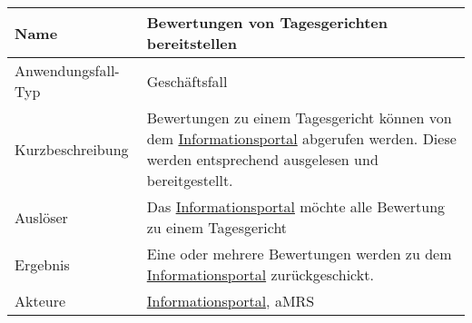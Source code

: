 \begin{table}[H]
    \centering
    \label{bewertungenbereitstellen}
    \begin{tabularx}{\textwidth}{| l | X |}
        \hline
        Name               & Bewertungen von Tagesgerichten bereitstellen                                                                                                                                      \\
        \hline
        Anwendungsfall-Typ & Geschäftsfall                                                                                                                                                                     \\
        \hline
        Kurzbeschreibung   & Bewertungen zu einem Tagesgericht können von dem \hyperref[gls:informationsportal]{Informationsportal} abgerufen werden. Diese werden entsprechend ausgelesen und bereitgestellt. \\
        \hline
        Auslöser           & Das \hyperref[gls:informationsportal]{Informationsportal} möchte alle Bewertung zu einem Tagesgericht                                                                             \\
        \hline
        Ergebnis           & Eine oder mehrere Bewertungen werden zu dem \hyperref[gls:informationsportal]{Informationsportal} zurückgeschickt.                                                                \\
        \hline
        Akteure            & \hyperref[gls:informationsportal]{Informationsportal}, \ac{aMRS}                                                                                                                  \\
        \hline
    \end{tabularx}
\end{table}

